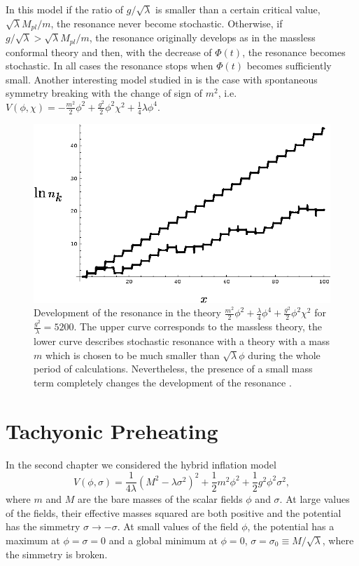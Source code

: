 \documentclass[11pt,a4paper,twoside]{book}
\begin{document}
In this model if the ratio of $ g/\sqrt{\lambda} $ is smaller than a certain critical value, $ \sqrt{\lambda}M_{pl}/m $, the resonance never become stochastic. Otherwise, if $g/\sqrt{\lambda} > \sqrt{\lambda}M_{pl}/m $, the resonance originally develops as in the massless conformal theory and then, with the decrease of $ \Phi(t) $, the resonance becomes stochastic. In all cases the resonance stops when $ \Phi(t) $ becomes sufficiently small. Another interesting model studied in \cite{Chap4:ModelLambdaPhi4Reference} is the case with spontaneous symmetry breaking with the change of sign of $ m^{2} $, i.e.  $V(\phi,\chi)= -\frac{m^{2}}{2}\phi^{2} + \frac{g^{2}}{2}\phi^{2}\chi^{2} +\frac{1}{4} \lambda \phi^{4} $.
\begin{figure}
	\centering
	\includegraphics[width=0.6\linewidth, height=0.3\textheight]{Images/Chap4/ConformalTheory_Fig9}
	\caption{Development of the resonance in the theory $ \frac{m^{2}}{2}\phi^{2} + \frac{\lambda}{4}\phi^{4} + \frac{g^{2}}{2}\phi^{2}\chi^{2} $ for $ \frac{g^{2}}{\lambda}=5200 $. The upper curve corresponds to the massless theory, the lower curve describes stochastic resonance  with a theory with a mass $ m $ which is chosen to be much smaller than $ \sqrt{\lambda}\phi $ during the whole period of calculations. Nevertheless, the presence of a small mass term completely changes the development of the resonance \cite{Chap4:ModelLambdaPhi4Reference}.}
	\label{fig:conformaltheoryfig9}
\end{figure}


\section{Tachyonic Preheating}
In the second chapter we considered the hybrid inflation model
\begin{equation}
\label{Chap4:TachyonicPreheating_InflationModel}
V(\phi,\sigma)=\frac{1}{4\lambda}(M^{2}-\lambda\sigma^{2})^{2} + \frac{1}{2}m^{2}\phi^{2} + \frac{1}{2}g^{2}\phi^{2}\sigma^{2},
\end{equation}
where $ m $ and $ M $ are the bare masses of the scalar fields $\phi$ and $\sigma$. At large values of the fields, their effective masses squared are both positive and the potential  has the simmetry $ \sigma \rightarrow -\sigma $. At small values of the field $\phi$, the potential has a maximum at $\phi=\sigma=0$ and a global minimum at $\phi=0$, $\sigma=\sigma_{0} \equiv M/\sqrt{\lambda}$, where the simmetry is broken.
\end{document}
